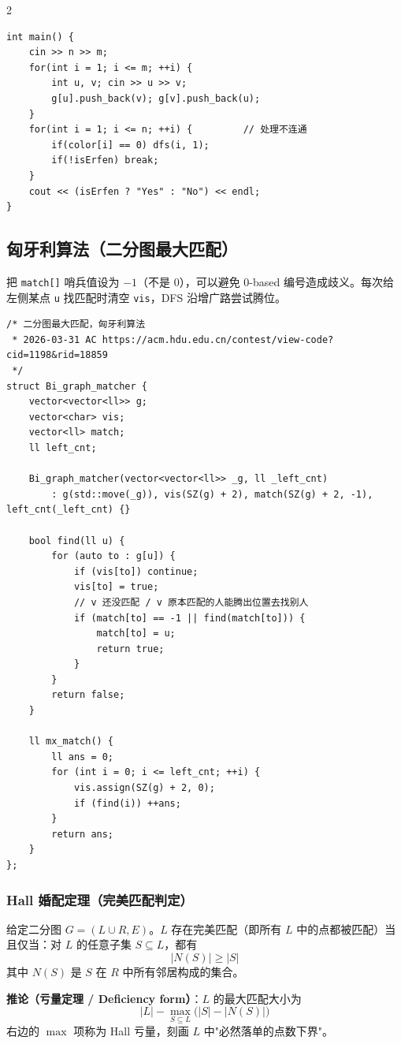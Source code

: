 \begin{multicols*}{2}
\begin{verbatim}
int main() {
    cin >> n >> m;
    for(int i = 1; i <= m; ++i) {
        int u, v; cin >> u >> v;
        g[u].push_back(v); g[v].push_back(u);
    }
    for(int i = 1; i <= n; ++i) {         // 处理不连通
        if(color[i] == 0) dfs(i, 1);
        if(!isErfen) break;
    }
    cout << (isErfen ? "Yes" : "No") << endl;
}
		\end{verbatim}


		\subsection{匈牙利算法（二分图最大匹配）}

		把 \texttt{match[]} 哨兵值设为 $-1$（不是 $0$），可以避免 0-based 编号造成歧义。每次给左侧某点 \texttt{u} 找匹配时清空 \texttt{vis}，DFS 沿增广路尝试腾位。

		\begin{verbatim}
/* 二分图最大匹配，匈牙利算法
 * 2026-03-31 AC https://acm.hdu.edu.cn/contest/view-code?cid=1198&rid=18859
 */
struct Bi_graph_matcher {
    vector<vector<ll>> g;
    vector<char> vis;
    vector<ll> match;
    ll left_cnt;

    Bi_graph_matcher(vector<vector<ll>> _g, ll _left_cnt)
        : g(std::move(_g)), vis(SZ(g) + 2), match(SZ(g) + 2, -1), left_cnt(_left_cnt) {}

    bool find(ll u) {
        for (auto to : g[u]) {
            if (vis[to]) continue;
            vis[to] = true;
            // v 还没匹配 / v 原本匹配的人能腾出位置去找别人
            if (match[to] == -1 || find(match[to])) {
                match[to] = u;
                return true;
            }
        }
        return false;
    }

    ll mx_match() {
        ll ans = 0;
        for (int i = 0; i <= left_cnt; ++i) {
            vis.assign(SZ(g) + 2, 0);
            if (find(i)) ++ans;
        }
        return ans;
    }
};
		\end{verbatim}

		\subsubsection{Hall 婚配定理（完美匹配判定）}

		给定二分图 $G = (L \cup R, E)$。$L$ 存在完美匹配（即所有 $L$ 中的点都被匹配）当且仅当：对 $L$ 的任意子集 $S \subseteq L$，都有
		$$|N(S)| \ge |S|$$
		其中 $N(S)$ 是 $S$ 在 $R$ 中所有邻居构成的集合。

		\textbf{推论（亏量定理 / Deficiency form）}：$L$ 的最大匹配大小为
		$$|L| - \max_{S \subseteq L} \bigl(|S| - |N(S)|\bigr)$$
		右边的 $\max$ 项称为 Hall 亏量，刻画 $L$ 中"必然落单的点数下界"。


\end{multicols*}
